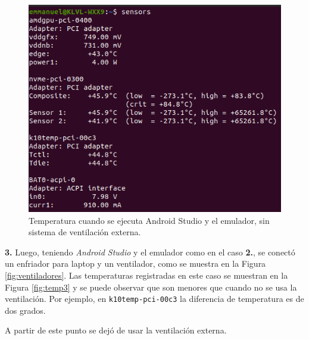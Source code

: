 \documentclass{article}
\begin{document}
\begin{figure}[htbp]

\center

\includegraphics[scale=0.5]{imagenes/temp2}

\caption{Temperatura cuando se ejecuta Android Studio y el emulador, sin sistema de ventilación externa.} \label{fig:temp2}

\end{figure}

\textbf{3.} Luego, teniendo \textit{Android Studio} y el emulador como en el caso \textbf{2.}, se conectó un enfriador para laptop y un ventilador, como se muestra en la Figura \ref{fig:ventiladores}. Las temperaturas registradas en este caso se muestran en la Figura \ref{fig:temp3} y se puede observar que son menores que cuando no se usa la ventilación. Por ejemplo, en \texttt{k10temp-pci-00c3} la diferencia de temperatura es de dos grados.

A partir de este punto se dejó de usar la ventilación externa.
\end{document}
